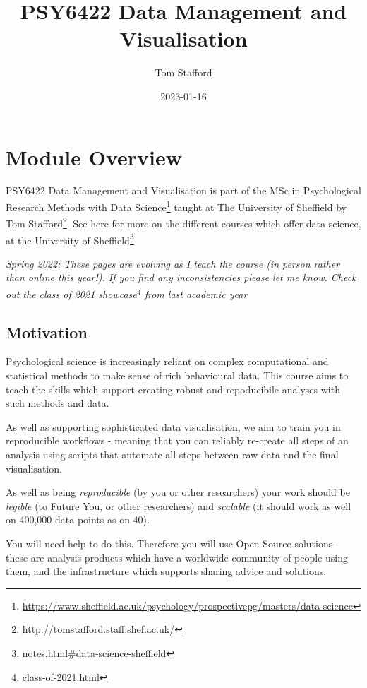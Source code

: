 \documentclass[
  12pt,
  a5paper,
]{book}
\title{PSY6422 Data Management and Visualisation}
\author{Tom Stafford}
\date{2023-01-16}
\DeclareRobustCommand{\href}[2]{#2\footnote{\url{#1}}}
\begin{document}
\maketitle

{
\setcounter{tocdepth}{2}
\tableofcontents
}
\hypertarget{module-overview}{%
\chapter*{Module Overview}\label{module-overview}}


PSY6422 Data Management and Visualisation is part of the \href{https://www.sheffield.ac.uk/psychology/prospectivepg/masters/data-science}{MSc in Psychological Research Methods with Data Science} taught at The University of Sheffield by \href{http://tomstafford.staff.shef.ac.uk/}{Tom Stafford}. See here for more on the different courses which offer \href{notes.html\#data-science-sheffield}{data science, at the University of Sheffield}

\emph{Spring 2022: These pages are evolving as I teach the course (in person rather than online this year!). If you find any inconsistencies please let me know. Check out the \href{class-of-2021.html}{class of 2021 showcase} from last academic year}

\hypertarget{motivation}{%
\section{Motivation}\label{motivation}}

Psychological science is increasingly reliant on complex computational and statistical methods to make sense of rich behavioural data. This course aims to teach the skills which support creating robust and repoducibile analyses with such methods and data.

As well as supporting sophisticated data visualisation, we aim to train you in reproducible workflows - meaning that you can reliably re-create all steps of an analysis using scripts that automate all steps between raw data and the final visualisation.

As well as being \emph{reproducible} (by you or other researchers) your work should be \emph{legible} (to Future You, or other researchers) and \emph{scalable} (it should work as well on 400,000 data points as on 40).

You will need help to do this. Therefore you will use Open Source solutions - these are analysis products which have a worldwide community of people using them, and the infrastructure which supports sharing advice and solutions.
\end{document}

